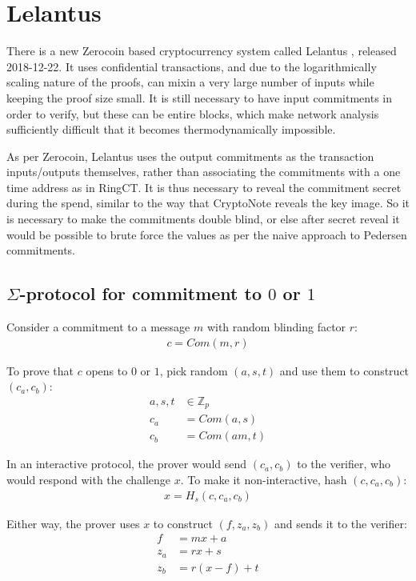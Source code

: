 \documentclass{article}
\begin{document}
\section{Lelantus}

There is a new Zerocoin based cryptocurrency system called Lelantus \cite{lelantus}, released 2018-12-22.  It uses confidential transactions, and due to the logarithmically scaling nature of the proofs, can mixin a very large number of inputs while keeping the proof size small.  It is still necessary to have input commitments in order to verify, but these can be entire blocks, which make network analysis sufficiently difficult that it becomes thermodynamically impossible.

As per Zerocoin, Lelantus uses the output commitments as the transaction inputs/outputs themselves, rather than associating the commitments with a one time address as in RingCT.  It is thus necessary to reveal the commitment secret during the spend, similar to the way that CryptoNote reveals the key image.  So it is necessary to make the commitments double blind, or else after secret reveal it would be possible to brute force the values as per the naive approach to Pedersen commitments.


\subsection{$\Sigma$-protocol for commitment to $0$ or $1$}

Consider a commitment to a message $m$ with random blinding factor $r$:
\begin{align}
  c=Com(m, r)
\end{align}

To prove that $c$ opens to $0$ or $1$, pick random $(a,s,t)$ and use them to construct $(c_a, c_b)$:
\begin{align}
  a,s,t &\in \mathbb{Z}_p\\
  c_a &= Com(a, s)\\
  c_b &= Com(am, t)
\end{align}

In an interactive protocol, the prover would send $(c_a,c_b)$ to the verifier, who would respond with the challenge $x$.  To make it non-interactive, hash $(c, c_a, c_b)$:
\begin{align}
  x = H_s(c, c_a, c_b)
\end{align}

Either way, the prover uses $x$ to construct $(f, z_a, z_b)$ and sends it to the verifier:
\begin{align}
  f &= mx + a\\
  z_a &= rx + s\\
  z_b &= r(x-f) + t
\end{align}
\end{document}
